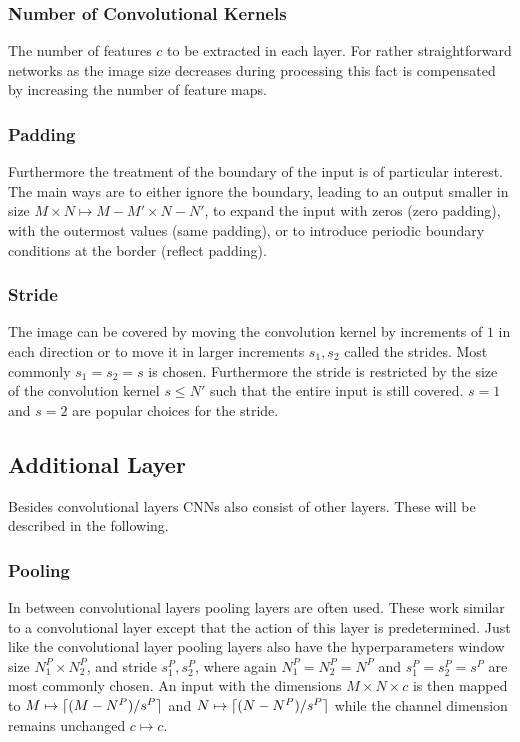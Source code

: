 \subsubsection{Number of Convolutional Kernels}
The number of features $c$ to be extracted in each layer. For rather straightforward networks as the image size decreases during processing this fact is compensated by increasing the number of feature maps. 

\subsubsection{Padding}
Furthermore the treatment of the boundary of the input is of particular interest. The main ways are to either ignore the boundary, leading to an output smaller in size $M\times N \mapsto M-M' \times N-N'$, to expand the input with zeros (zero padding), with the outermost values (same padding), or to introduce periodic boundary conditions at the border (reflect padding).

\subsubsection{Stride}
The image can be covered by moving the convolution kernel by increments of $1$ in each direction or to move it in larger increments $s_1,s_2$ called the strides. Most commonly $s_1 = s_2 = s$ is chosen. Furthermore the stride is restricted by the size of the convolution kernel $s\leq N'$ such that the entire input is still covered. $s=1$ and $s=2$ are popular choices for the stride.

\subsection{Additional Layer}
Besides convolutional layers CNNs also consist of other layers. These will be described in the following.

\subsubsection{Pooling}
In between convolutional layers pooling layers are often used. These work similar to a convolutional layer except that the action of this layer is predetermined. Just like the convolutional layer pooling layers also have the hyperparameters window size $N^P_1 \times N^P_2$, and stride $s_1^P,s_2^P$, where again $N^P_1 = N^P_2 = N^P$ and $s_1^P=s_2^P=s^P$ are most commonly chosen. An input with the  dimensions $M \times N \times c$ is then mapped to  $M \mapsto \lceil(M-N^P)/s^P\rceil $ and $N \mapsto \lceil(N-N^P)/s^P\rceil$ while the channel dimension remains unchanged $c \mapsto c$.\\


